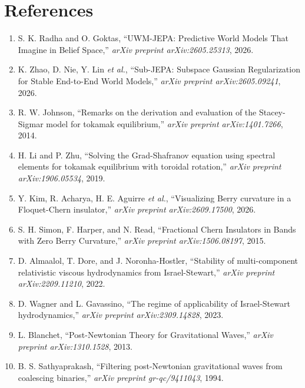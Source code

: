 \documentclass[10pt,journal,compsoc]{IEEEtran}
\theoremstyle{definition}
\begin{document}
\section*{References}
\begin{enumerate}
    \item S. K. Radha and O. Goktas, ``UWM-JEPA: Predictive World Models That Imagine in Belief Space,'' \textit{arXiv preprint arXiv:2605.25313}, 2026.
    \item K. Zhao, D. Nie, Y. Lin \textit{et al.}, ``Sub-JEPA: Subspace Gaussian Regularization for Stable End-to-End World Models,'' \textit{arXiv preprint arXiv:2605.09241}, 2026.
    \item R. W. Johnson, ``Remarks on the derivation and evaluation of the Stacey-Sigmar model for tokamak equilibrium,'' \textit{arXiv preprint arXiv:1401.7266}, 2014.
    \item H. Li and P. Zhu, ``Solving the Grad-Shafranov equation using spectral elements for tokamak equilibrium with toroidal rotation,'' \textit{arXiv preprint arXiv:1906.05534}, 2019.
    \item Y. Kim, R. Acharya, H. E. Aguirre \textit{et al.}, ``Visualizing Berry curvature in a Floquet-Chern insulator,'' \textit{arXiv preprint arXiv:2609.17500}, 2026.
    \item S. H. Simon, F. Harper, and N. Read, ``Fractional Chern Insulators in Bands with Zero Berry Curvature,'' \textit{arXiv preprint arXiv:1506.08197}, 2015.
    \item D. Almaalol, T. Dore, and J. Noronha-Hostler, ``Stability of multi-component relativistic viscous hydrodynamics from Israel-Stewart,'' \textit{arXiv preprint arXiv:2209.11210}, 2022.
    \item D. Wagner and L. Gavassino, ``The regime of applicability of Israel-Stewart hydrodynamics,'' \textit{arXiv preprint arXiv:2309.14828}, 2023.
    \item L. Blanchet, ``Post-Newtonian Theory for Gravitational Waves,'' \textit{arXiv preprint arXiv:1310.1528}, 2013.
    \item B. S. Sathyaprakash, ``Filtering post-Newtonian gravitational waves from coalescing binaries,'' \textit{arXiv preprint gr-qc/9411043}, 1994.
\end{enumerate}
\end{document}
